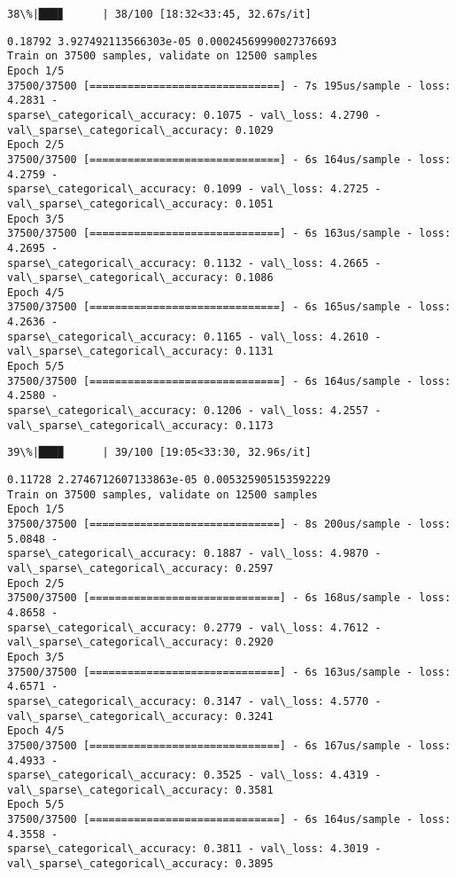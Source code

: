 \documentclass[11pt]{article}
\begin{document}
    \begin{Verbatim}[commandchars=\\\{\}]
 38\%|███▊      | 38/100 [18:32<33:45, 32.67s/it]
    \end{Verbatim}

    \begin{Verbatim}[commandchars=\\\{\}]
0.18792 3.927492113566303e-05 0.00024569990027376693
Train on 37500 samples, validate on 12500 samples
Epoch 1/5
37500/37500 [==============================] - 7s 195us/sample - loss: 4.2831 -
sparse\_categorical\_accuracy: 0.1075 - val\_loss: 4.2790 -
val\_sparse\_categorical\_accuracy: 0.1029
Epoch 2/5
37500/37500 [==============================] - 6s 164us/sample - loss: 4.2759 -
sparse\_categorical\_accuracy: 0.1099 - val\_loss: 4.2725 -
val\_sparse\_categorical\_accuracy: 0.1051
Epoch 3/5
37500/37500 [==============================] - 6s 163us/sample - loss: 4.2695 -
sparse\_categorical\_accuracy: 0.1132 - val\_loss: 4.2665 -
val\_sparse\_categorical\_accuracy: 0.1086
Epoch 4/5
37500/37500 [==============================] - 6s 165us/sample - loss: 4.2636 -
sparse\_categorical\_accuracy: 0.1165 - val\_loss: 4.2610 -
val\_sparse\_categorical\_accuracy: 0.1131
Epoch 5/5
37500/37500 [==============================] - 6s 164us/sample - loss: 4.2580 -
sparse\_categorical\_accuracy: 0.1206 - val\_loss: 4.2557 -
val\_sparse\_categorical\_accuracy: 0.1173
    \end{Verbatim}

    \begin{Verbatim}[commandchars=\\\{\}]
 39\%|███▉      | 39/100 [19:05<33:30, 32.96s/it]
    \end{Verbatim}

    \begin{Verbatim}[commandchars=\\\{\}]
0.11728 2.2746712607133863e-05 0.005325905153592229
Train on 37500 samples, validate on 12500 samples
Epoch 1/5
37500/37500 [==============================] - 8s 200us/sample - loss: 5.0848 -
sparse\_categorical\_accuracy: 0.1887 - val\_loss: 4.9870 -
val\_sparse\_categorical\_accuracy: 0.2597
Epoch 2/5
37500/37500 [==============================] - 6s 168us/sample - loss: 4.8658 -
sparse\_categorical\_accuracy: 0.2779 - val\_loss: 4.7612 -
val\_sparse\_categorical\_accuracy: 0.2920
Epoch 3/5
37500/37500 [==============================] - 6s 163us/sample - loss: 4.6571 -
sparse\_categorical\_accuracy: 0.3147 - val\_loss: 4.5770 -
val\_sparse\_categorical\_accuracy: 0.3241
Epoch 4/5
37500/37500 [==============================] - 6s 167us/sample - loss: 4.4933 -
sparse\_categorical\_accuracy: 0.3525 - val\_loss: 4.4319 -
val\_sparse\_categorical\_accuracy: 0.3581
Epoch 5/5
37500/37500 [==============================] - 6s 164us/sample - loss: 4.3558 -
sparse\_categorical\_accuracy: 0.3811 - val\_loss: 4.3019 -
val\_sparse\_categorical\_accuracy: 0.3895
    \end{Verbatim}
\end{document}

